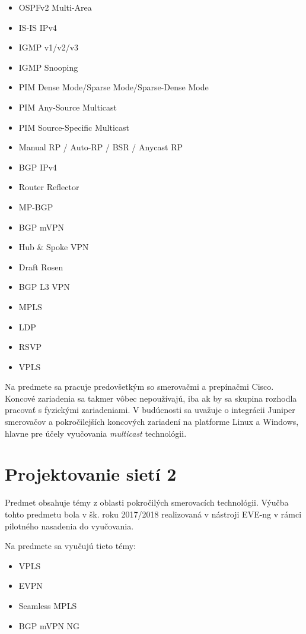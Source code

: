 \begin{itemize}[noitemsep]
    \item OSPFv2 Multi-Area
    \item IS-IS IPv4 
    \item IGMP v1/v2/v3
    \item IGMP Snooping
    \item PIM Dense Mode/Sparse Mode/Sparse-Dense Mode
    \item PIM Any-Source Multicast
    \item PIM Source-Specific Multicast
    \item Manual RP / Auto-RP / BSR / Anycast RP
    \item BGP IPv4
    \item Router Reflector
    \item MP-BGP
    \item BGP mVPN
    \item Hub \& Spoke VPN
    \item Draft Rosen
    \item BGP L3 VPN
    \item MPLS
    \item LDP
    \item RSVP
    \item VPLS
\end{itemize}

Na predmete sa pracuje predovšetkým so smerovačmi a prepínačmi Cisco. Koncové zariadenia sa takmer vôbec nepoužívajú, iba ak by sa skupina rozhodla pracovať s fyzickými zariadeniami. V budúcnosti sa uvažuje o integrácii Juniper smerovačov a pokročilejších koncových zariadení na platforme Linux a Windows, hlavne pre účely vyučovania \emph{multicast} technológii.



\section{Projektovanie sietí 2}

Predmet obsahuje témy z oblasti pokročilých smerovacích technológii. Výučba tohto predmetu bola v šk. roku 2017/2018 realizovaná v nástroji EVE-ng v rámci pilotného nasadenia do vyučovania.

Na predmete sa vyučujú tieto témy:

\begin{itemize}[noitemsep]
    \item VPLS
    \item EVPN
    \item Seamless MPLS
    \item BGP mVPN NG
\end{itemize}


